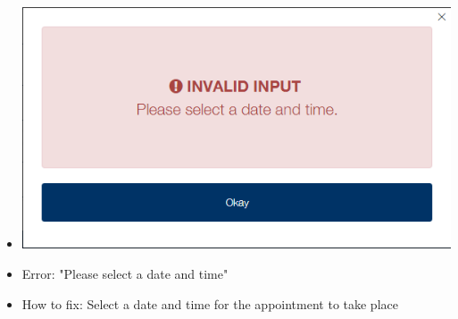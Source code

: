 \begin{itemize}
\begin{itemize}
				\item \includegraphics[width=\linewidth]{images/Screenshots/Errors/NotLoggedIn/Date.png}
				\item Error: "Please select a date and time"
				\item How to fix: Select a date and time for the appointment to take place
				

\end{itemize}
\end{itemize}
